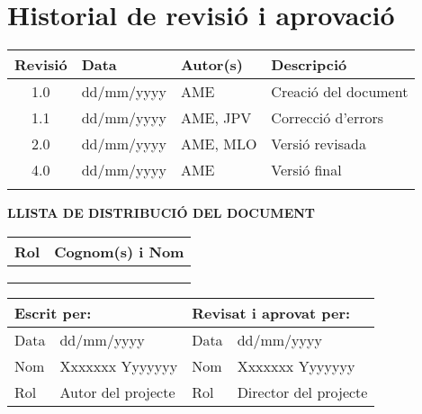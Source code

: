 \vspace*{0cm}

\chapter*{Historial de revisió i aprovació}

\begin{tabularx}{\textwidth}{|c|l|l|X|}
  \hline
    \textbf{Revisió} & \textbf{Data} & \textbf{Autor(s)} & \textbf{Descripció} \\
  \hline
    1.0 & dd/mm/yyyy & AME & Creació del document \\
  \hline
    1.1 & dd/mm/yyyy & AME, JPV & Correcció d'errors \\
  \hline
    2.0 & dd/mm/yyyy & AME, MLO & Versió revisada \\
  \hline
    4.0 & dd/mm/yyyy & AME & Versió final \\
  \hline
    & & & \\
  \hline
\end{tabularx}

\vspace{1cm}

\textbf{LLISTA DE DISTRIBUCIÓ DEL DOCUMENT}

\begin{tabularx}{\textwidth}{|l|X|}
  \hline
    \textbf{Rol} & \textbf{Cognom(s) i Nom} \\
  \hline
    [Estudiant] &  \\
  \hline
    [Director del projecte] &  \\
  \hline
    [Director 2 (si aplica)] &  \\
  \hline
\end{tabularx}

\vspace{1cm}

\begin{tabularx}{\textwidth}{|l|X||l|X|}
  \hline
    \multicolumn{2}{|l||}{\textbf{Escrit per:}}  &  \multicolumn{2}{l|}{\textbf{Revisat i aprovat per:}} \\
  \hline
    Data &  dd/mm/yyyy & Data &  dd/mm/yyyy \\
  \hline
    Nom &  Xxxxxxx Yyyyyyy & Nom &  Xxxxxxx Yyyyyyy \\
  \hline
    Rol & Autor del projecte & Rol & Director del projecte \\
  \hline
\end{tabularx}

